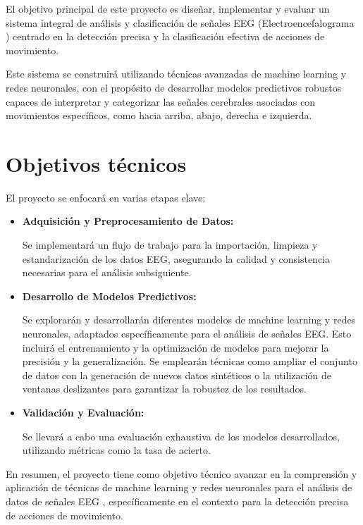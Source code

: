 
El objetivo principal de este proyecto es diseñar, implementar y evaluar un sistema integral de análisis y clasificación de señales EEG (Electroencefalograma ) centrado en la detección precisa y la clasificación efectiva de acciones de movimiento. 

Este sistema se construirá utilizando técnicas avanzadas de machine learning y redes neuronales, con el propósito de desarrollar modelos predictivos robustos capaces de interpretar y categorizar las señales cerebrales asociadas con movimientos específicos, como hacia arriba, abajo, derecha e izquierda.


\section{Objetivos  técnicos}


El proyecto se enfocará en varias etapas clave:

\begin{itemize}
\item
\textbf{Adquisición y Preprocesamiento de Datos:}

 Se implementará un flujo de trabajo para la importación, limpieza y estandarización de los datos EEG, asegurando la calidad y consistencia necesarias para el análisis subsiguiente.

\item
\textbf{Desarrollo de Modelos Predictivos:}

 Se explorarán y desarrollarán diferentes modelos de machine learning y redes neuronales, adaptados específicamente para el análisis de señales EEG. Esto incluirá el entrenamiento y la optimización de modelos para mejorar la precisión y la generalización. Se emplearán técnicas como ampliar el conjunto de datos con la generación de nuevos datos sintéticos o la utilización de ventanas deslizantes para garantizar la robustez de los resultados.

\item
\textbf{Validación y Evaluación:} 

Se llevará a cabo una evaluación exhaustiva de los modelos desarrollados, utilizando métricas como la tasa de acierto.

\end{itemize}

En resumen, el proyecto tiene como objetivo técnico avanzar en la comprensión y aplicación de técnicas de machine learning y redes neuronales para el análisis de datos de señales EEG , específicamente en el contexto  para la detección precisa de acciones de movimiento.

